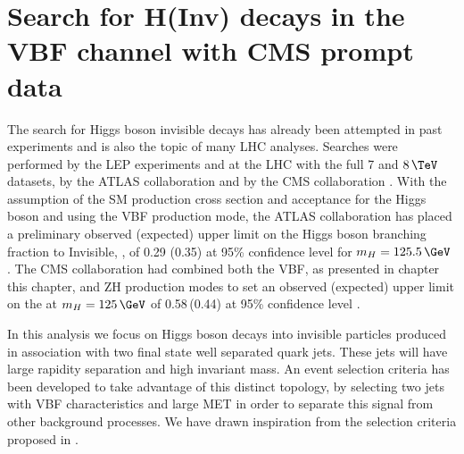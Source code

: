 \chapter{Search for H(Inv) decays in the VBF channel with CMS prompt data}
\label{CHAPTER:PromptDataAnalysis}



The search for Higgs boson invisible decays has already been attempted in past experiments and is also the topic of many \gls{LHC} analyses. Searches were performed by the \gls{LEP} experiments \cite{ARTICLE:LEPSearchesForInvisibleHiggsBosons,ARTICLE:LEPDELPHISearchesForInvisibleDecayingHiggsBosons,ARTICLE:LEPOPALSearchForInvisiblyDecayingHiggsBosons} and at the \gls{LHC} with the full 7 and $8\,\TeV$ datasets, by the \gls{ATLAS} collaboration \cite{ARTICLE:ATLASSearchForInvisibleDecaysHiggsBosonAssociatedZ,ARTICLE:ATLASSearchForDarkMatterWithHadronicallyWorZ,ARTICLE:ATLASMonoJetPlusMET,ARTICLE:ATLASVBFHiggsInvConfNote} and by the \gls{CMS} collaboration \cite{ARTICLE:CMSVBFHiggsToInvAndZHCombination}. With the assumption of the \gls{SM} production cross section and acceptance for the Higgs boson and using the \gls{VBF} production mode, the \gls{ATLAS} collaboration has placed a preliminary observed (expected) upper limit on the Higgs boson branching fraction to Invisible, \BRinv, of 0.29 (0.35) at 95\% confidence level for $m_H=125.5\,\GeV$ \cite{ARTICLE:ATLASVBFHiggsInvConfNote}. The \gls{CMS} collaboration had combined both the \gls{VBF}, as presented in chapter this chapter, and ZH production modes to set an observed (expected) upper limit on the \BRinv at  $m_H=125\,\GeV$ of 0.58\,(0.44) at 95\% confidence level \cite{ARTICLE:CMSVBFHiggsToInvAndZHCombination}.

In this analysis we focus on Higgs boson decays into invisible particles produced in association with two final state well separated quark jets. These jets will have large rapidity separation and high invariant mass. An event selection criteria has been developed to take advantage of this distinct topology, by selecting two jets with \gls{VBF} characteristics and large \gls{MET} in order to separate this signal from other background processes. We have drawn inspiration from the selection criteria proposed in \cite{ARTICLE:Zeppenfeld_ObservingAnInvisibleHiggsboson}.

